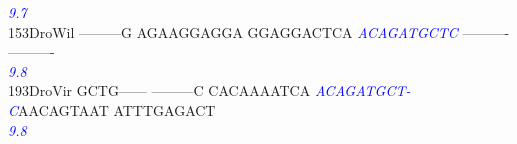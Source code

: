 \documentclass[11pt,twoside,reqno,a4paper]{article}
\begin{document}
{\hspace*{4\charwidth}\hspace*{7\charwidth}\hspace*{1\charwidth}\hspace*{1\charwidth}\hspace*{1\charwidth}\hspace*{30\charwidth}\textit{\textcolor{Blue}{9.7}}\hspace*{1\charwidth}\hspace*{1\charwidth}\hspace*{1\charwidth}\\
153\hspace*{1\charwidth}DroWil	---------G	AGAAGGAGGA	GGAGGACTCA	\textit{\textcolor{Blue}{A}}\textit{\textcolor{Blue}{C}}\textit{\textcolor{Blue}{A}}\textit{\textcolor{Blue}{G}}\textit{\textcolor{Blue}{A}}\textit{\textcolor{Blue}{T}}\textit{\textcolor{Blue}{G}}\textit{\textcolor{Blue}{C}}\textit{\textcolor{Blue}{T}}\textit{\textcolor{Blue}{C}}	----------	----------	\\
\hspace*{4\charwidth}\hspace*{7\charwidth}\hspace*{1\charwidth}\hspace*{1\charwidth}\hspace*{1\charwidth}\hspace*{30\charwidth}\textit{\textcolor{Blue}{9.8}}\hspace*{1\charwidth}\hspace*{1\charwidth}\hspace*{1\charwidth}\\
193\hspace*{1\charwidth}DroVir	GCTG------	---------C	CACAAAATCA	\textit{\textcolor{Blue}{A}}\textit{\textcolor{Blue}{C}}\textit{\textcolor{Blue}{A}}\textit{\textcolor{Blue}{G}}\textit{\textcolor{Blue}{A}}\textit{\textcolor{Blue}{T}}\textit{\textcolor{Blue}{G}}\textit{\textcolor{Blue}{C}}\textit{\textcolor{Blue}{T}}\textit{\textcolor{Blue}{-}}	\textit{\textcolor{Blue}{C}}AACAGTAAT	ATTTGAGACT	\\
\hspace*{4\charwidth}\hspace*{7\charwidth}\hspace*{1\charwidth}\hspace*{1\charwidth}\hspace*{1\charwidth}\hspace*{30\charwidth}\textit{\textcolor{Blue}{9.8}}\hspace*{1\charwidth}\hspace*{1\charwidth}\hspace*{1\charwidth}\\
}
\end{document}
